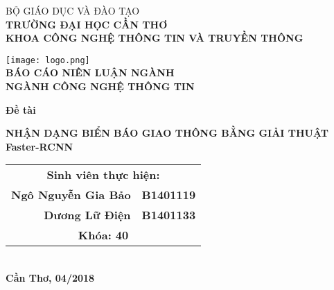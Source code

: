 \documentclass[../thesis.tex]{subfiles}
\begin{document}
\begin{titlepage}

\begin{center}

BỘ GIÁO DỤC VÀ ĐÀO TẠO\\
\textbf{TRƯỜNG ĐẠI HỌC CẦN THƠ\\}
\textbf{KHOA CÔNG NGHỆ THÔNG TIN VÀ TRUYỀN THÔNG\\[1cm]}

\texttt{[image: logo.png]}\\[1cm]

\textbf{BÁO CÁO NIÊN LUẬN NGÀNH\\}
\textbf{NGÀNH CÔNG NGHỆ THÔNG TIN\\[2cm]}

\begin{large}
\textbf{Đề tài\\[0.5cm]}
\end{large}
\textbf{{\LARGE NHẬN DẠNG BIỂN BÁO GIAO THÔNG BẰNG GIẢI THUẬT Faster-RCNN}}
\\[3.5cm]

\begin{tabular}{ r l }
	\multicolumn{2}{c}{\textbf{Sinh viên thực hiện:}}\\ 
	\textbf{Ngô Nguyễn Gia Bảo} & \textbf{B1401119}\\  
	\textbf{Dương Lữ Điện} & \textbf{B1401133}\\
	\multicolumn{2}{c}{\textbf{Khóa: 40}}\\   
\end{tabular}
\\[4cm]

\textbf{Cần Thơ, 04/2018}

\end{center}

\end{titlepage}
\end{document}
